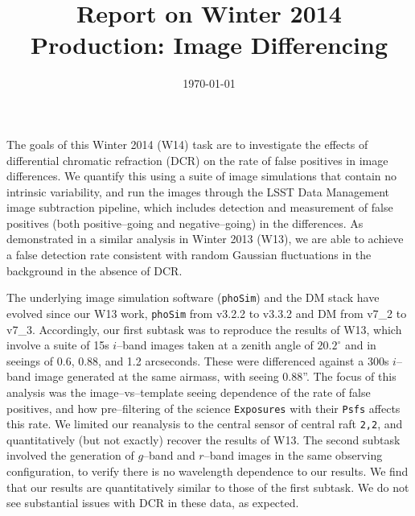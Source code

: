 \documentclass[prd, nofootinbib, floatfix, 11pt, tightenlines, times]{article}
\title{\vspace{-22mm} \Large{Report on Winter 2014 Production: Image Differencing}}
\date{\today}
\author{
}
\begin{document}
\maketitle\vspace{-8mm}

The goals of this Winter 2014 (W14) task are to investigate the
effects of differential chromatic refraction (DCR) on the rate of
false positives in image differences.  We quantify this using a suite
of image simulations that contain no intrinsic variability, and run
the images through the LSST Data Management image subtraction
pipeline, which includes detection and measurement of false positives
(both positive--going and negative--going) in the differences.  As
demonstrated in a similar analysis in Winter 2013 (W13), we are able
to achieve a false detection rate consistent with random Gaussian
fluctuations in the background in the absence of DCR.

The underlying image simulation software ({\tt phoSim}) and the DM
stack have evolved since our W13 work, {\tt phoSim} from v3.2.2 to
v3.3.2 and DM from v7\_2 to v7\_3.  Accordingly, our first subtask was
to reproduce the results of W13, which involve a suite of 15s
$i$--band images taken at a zenith angle of $20.2^{\circ}$ and in
seeings of 0.6, 0.88, and 1.2 arcseconds.  These were differenced
against a 300s $i$--band image generated at the same airmass, with
seeing 0.88''.  The focus of this analysis was the image--vs--template
seeing dependence of the rate of false positives, and how
pre--filtering of the science {\tt Exposures} with their {\tt Psfs}
affects this rate.  We limited our reanalysis to the central sensor of
central raft {\tt 2,2}, and quantitatively (but not exactly) recover
the results of W13.  The second subtask involved the generation of
$g$--band and $r$--band images in the same observing configuration, to
verify there is no wavelength dependence to our results.  We find that
our results are quantitatively similar to those of the first subtask.
We do not see substantial issues with DCR in these data, as expected.
\end{document}
